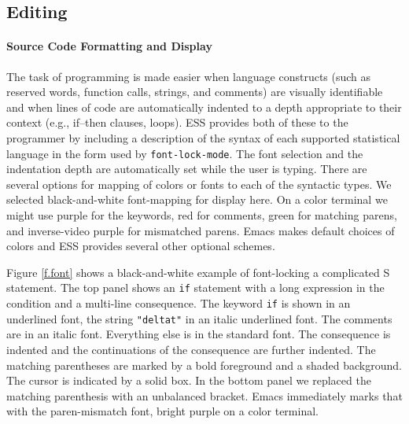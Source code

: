 \documentclass{article}
\newcommand{\stexttt}[1]{{\small\texttt{#1}}}
\begin{document}
\subsection{Editing}
\label{sec:ESS:features}

\paragraph{Source Code Formatting and Display}
The task of programming is made easier when language constructs (such
as reserved words, function calls, strings, and comments) are visually
identifiable and when lines of code are automatically indented to a
depth appropriate to their context (e.g., if--then clauses, loops).
ESS provides both of these to the programmer by including a
description of the syntax of each supported statistical language in
the form used by \stexttt{font-lock-mode}.  The font selection and the
indentation depth are automatically set while the user is typing.
There are several options for mapping of colors or fonts to each of
the syntactic types.  We selected black-and-white font-mapping for
display here.  On a color terminal we might use purple for the
keywords, red for comments, green for matching parens, and
inverse-video purple for mismatched parens.  Emacs makes default
choices of colors and ESS provides several other optional schemes.


Figure \ref{f.font} shows a black-and-white example of font-locking a
complicated S statement.  The top panel shows an \stexttt{if}
statement with a long expression in the condition and a multi-line
consequence.  The keyword \stexttt{if} is shown in an underlined font,
the string \stexttt{"deltat"} in an italic underlined font.  The
comments are in an italic font.  Everything else is in the standard
font.  The consequence is indented and the continuations of the
consequence are further indented.  The matching parentheses are marked
by a bold foreground and a shaded background.  The cursor is indicated
by a solid box.  In the bottom panel we replaced the matching
parenthesis with an unbalanced bracket.  Emacs immediately marks that
with the paren-mismatch font, bright purple on a color terminal.
\end{document}
